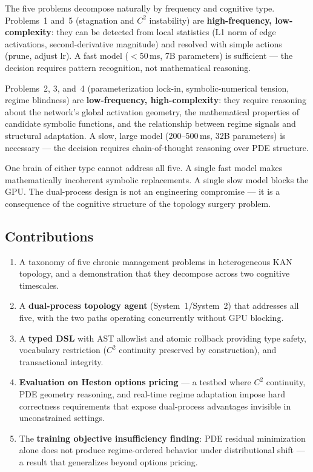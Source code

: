 \documentclass[11pt,a4paper]{article}
\begin{document}
The five problems decompose naturally by frequency and cognitive type. Problems~1
and~5 (stagnation and $C^2$ instability) are \textbf{high-frequency, low-complexity}:
they can be detected from local statistics (L1 norm of edge activations,
second-derivative magnitude) and resolved with simple actions (prune, adjust lr).
A fast model ($<$50\,ms, 7B parameters) is sufficient --- the decision requires
pattern recognition, not mathematical reasoning.

Problems~2, 3, and~4 (parameterization lock-in, symbolic-numerical tension, regime
blindness) are \textbf{low-frequency, high-complexity}: they require reasoning about
the network's global activation geometry, the mathematical properties of candidate
symbolic functions, and the relationship between regime signals and structural
adaptation. A slow, large model (200--500\,ms, 32B parameters) is necessary --- the
decision requires chain-of-thought reasoning over PDE structure.

One brain of either type cannot address all five. A single fast model makes
mathematically incoherent symbolic replacements. A single slow model blocks the GPU.
The dual-process design is not an engineering compromise --- it is a consequence of
the cognitive structure of the topology surgery problem.

\subsection{Contributions}
\label{sec:intro:contributions}

\begin{enumerate}
  \item A taxonomy of five chronic management problems in heterogeneous KAN topology,
  and a demonstration that they decompose across two cognitive timescales.

  \item A \textbf{dual-process topology agent} (System~1/System~2) that addresses all
  five, with the two paths operating concurrently without GPU blocking.

  \item A \textbf{typed DSL} with AST allowlist and atomic rollback providing type
  safety, vocabulary restriction ($C^2$ continuity preserved by construction), and
  transactional integrity.

  \item \textbf{Evaluation on Heston options pricing} --- a testbed where $C^2$
  continuity, PDE geometry reasoning, and real-time regime adaptation impose hard
  correctness requirements that expose dual-process advantages invisible in
  unconstrained settings.

  \item The \textbf{training objective insufficiency finding}: PDE residual
  minimization alone does not produce regime-ordered behavior under distributional
  shift --- a result that generalizes beyond options pricing.
\end{enumerate}
\end{document}
